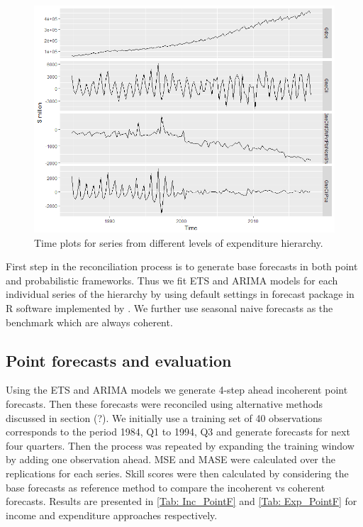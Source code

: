 \documentclass[graybox]{svmult}
\begin{document}
\begin{figure}[H]
	\centering
	\small
	\includegraphics[scale=0.50]{Figs/TS-plots/EXP-char-of-levels-TSplots.PNG}
	\caption{Time plots for series from different levels of expenditure hierarchy.}\label{TS-Exp}
\end{figure}

First step in the reconciliation process is to generate base forecasts in both point and probabilistic frameworks. Thus we fit ETS and ARIMA models for each individual series of the hierarchy by using default settings in forecast package in R software implemented by \citep{Hyndman2018}. We further use seasonal naive forecasts as the benchmark which are always coherent. 

\subsection{Point forecasts and evaluation}

Using the ETS and ARIMA models we generate 4-step ahead incoherent point forecasts. Then these forecasts were reconciled using alternative methods discussed in section (?). We initially use a training set of 40 observations corresponds to the period 1984, Q1 to 1994, Q3 and generate forecasts for next four quarters. Then the process was repeated by expanding the training window by adding one observation ahead. MSE and MASE were calculated over the replications for each series. Skill scores were then calculated by considering the base forecasts as reference method to compare the incoherent vs coherent forecasts. Results are presented in \ref{Tab: Inc_PointF} and \ref{Tab: Exp_PointF} for income and expenditure approaches respectively. \\
\end{document}
